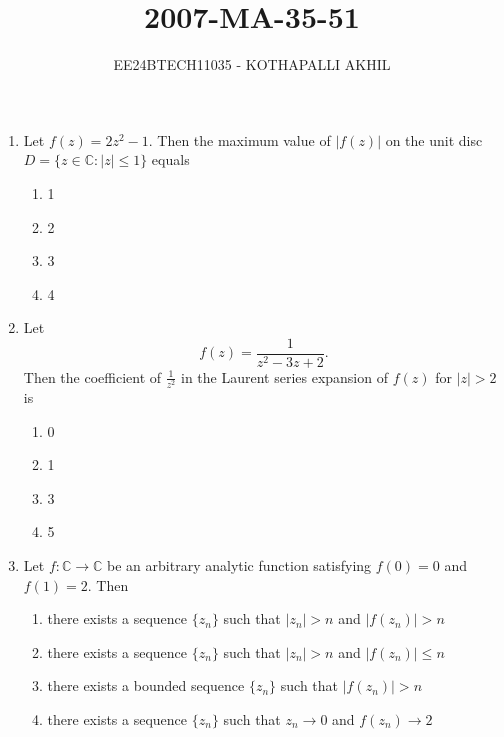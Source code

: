 \documentclass[journal]{IEEEtran}
\numberwithin{figure}{enumi}
\begin{document}


\title{2007-MA-35-51}
\author{EE24BTECH11035 - KOTHAPALLI AKHIL}
{\let\newpage\relax\maketitle}

\begin{enumerate}
\item Let $f(z) = 2z^2 - 1$. Then the maximum value of $|f(z)|$ on the unit disc $D = \{z \in \mathbb{C}: |z| \leq 1\}$ equals  
\begin{enumerate} 
    \item 1  
    \item 2  
    \item 3  
    \item 4  
\end{enumerate}

\item Let  
\begin{equation}
f(z) = \frac{1}{z^2 - 3z + 2}.
\end{equation}  
Then the coefficient of $\frac{1}{z^2}$ in the Laurent series expansion of $f(z)$ for $|z| > 2$ is
\begin{enumerate}
    \item 0
    \item 1
    \item 3
    \item 5
\end{enumerate}

\item  Let $f: \mathbb{C} \to \mathbb{C}$ be an arbitrary analytic function satisfying $f(0) = 0$ and $f(1) = 2$. Then
\begin{enumerate}
    \item there exists a sequence $\{z_n\}$ such that $|z_n| > n$ and $|f(z_n)| > n$
    \item there exists a sequence $\{z_n\}$ such that $|z_n| > n$ and $|f(z_n)| \leq n$
    \item there exists a bounded sequence $\{z_n\}$ such that $|f(z_n)| > n$
    \item there exists a sequence $\{z_n\}$ such that $z_n \to 0$ and $f(z_n) \to 2$
\end{enumerate}


\end{enumerate}
\end{document}
